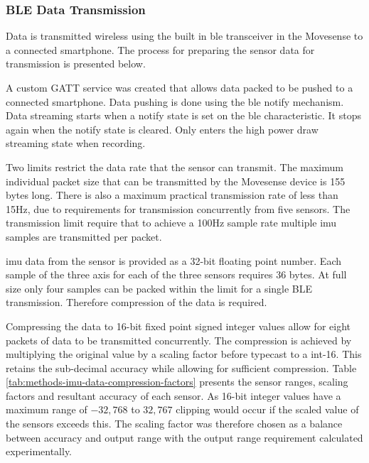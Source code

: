 \subsubsection{BLE Data Transmission}
\label{subsection:methods-on-sensor-compression}
Data is transmitted wireless using the built in \acrfull{ble} transceiver in the Movesense to a connected smartphone. The process for preparing the sensor data for transmission is presented below.

A custom GATT service was created that allows data packed to be pushed to a connected smartphone. Data pushing is done using the \acrshort{ble} notify mechanism. Data streaming starts when a notify state is set on the \acrshort{ble} characteristic. It stops again when the notify state is cleared. Only enters the high power draw streaming state when recording.

Two limits restrict the data rate that the sensor can transmit. The maximum individual packet size that can be transmitted by the Movesense device is 155 bytes long. There is also a maximum practical transmission rate of less than 15Hz, due to requirements for transmission concurrently from five sensors. The transmission limit require that to achieve a 100Hz sample rate multiple \acrshort{imu} samples are transmitted per packet.

\acrshort{imu} data from the sensor is provided as a 32-bit floating point number. Each sample of the three axis for each of the three sensors requires 36 bytes. At full size only four samples can be packed within the limit for a single BLE transmission. Therefore compression of the data is required.

Compressing the data to 16-bit fixed point signed integer values allow for eight packets of data to be transmitted concurrently. The compression is achieved by multiplying the original value by a scaling factor before typecast to a int-16. This retains the sub-decimal accuracy while allowing for sufficient compression. Table \ref{tab:methods-imu-data-compression-factors} presents the sensor ranges, scaling factors and resultant accuracy of each sensor. As 16-bit integer values have a maximum range of $-32,768$ to $32,767$ clipping would occur if the scaled value of the sensors exceeds this. The scaling factor was therefore chosen as a balance between accuracy and output range with the output range requirement calculated experimentally.

